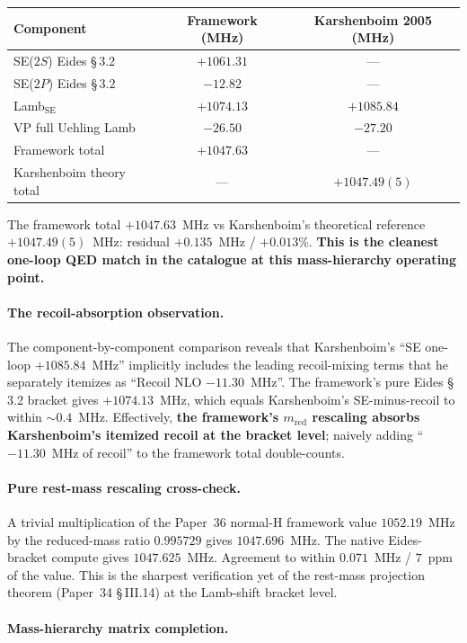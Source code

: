 \documentclass[11pt]{article}
\begin{document}
\begin{tabular}{lcc}
\toprule
Component & Framework (MHz) & Karshenboim 2005 (MHz) \\
\midrule
SE($2S$) Eides \S\,3.2 & $+1061.31$ & --- \\
SE($2P$) Eides \S\,3.2 & $-12.82$ & --- \\
Lamb$_\text{SE}$ & $+1074.13$ & $+1085.84$ \\
VP full Uehling Lamb & $-26.50$ & $-27.20$ \\
\midrule
Framework total & $+1047.63$ & --- \\
Karshenboim theory total & --- & $+1047.49(5)$ \\
\bottomrule
\end{tabular}

\noindent The framework total $+1047.63$~MHz vs Karshenboim's
theoretical reference $+1047.49(5)$~MHz: residual $+0.135$~MHz / $+0.013\%$.
\textbf{This is the cleanest one-loop QED match in the catalogue at this
mass-hierarchy operating point.}

\paragraph{The recoil-absorption observation.}  The component-by-component
comparison reveals that Karshenboim's ``SE one-loop $+1085.84$~MHz''
implicitly includes the leading recoil-mixing terms that he separately
itemizes as ``Recoil NLO $-11.30$~MHz''.  The framework's pure Eides
\S\,3.2 bracket gives $+1074.13$~MHz, which equals
Karshenboim's SE-minus-recoil to within $\sim 0.4$~MHz.  Effectively,
\textbf{the framework's $m_\text{red}$ rescaling absorbs Karshenboim's
itemized recoil at the bracket level}; naively adding ``$-11.30$~MHz of
recoil'' to the framework total double-counts.

\paragraph{Pure rest-mass rescaling cross-check.}  A trivial
multiplication of the Paper~36 normal-H framework value $1052.19$~MHz
by the reduced-mass ratio $0.995729$ gives $1047.696$~MHz.  The native
Eides-bracket compute gives $1047.625$~MHz.  Agreement to within
$0.071$~MHz / $7$~ppm of the value.  This is the sharpest verification
yet of the rest-mass projection theorem (Paper~34 \S\,III.14) at the
Lamb-shift bracket level.

\paragraph{Mass-hierarchy matrix completion.}
\end{document}

